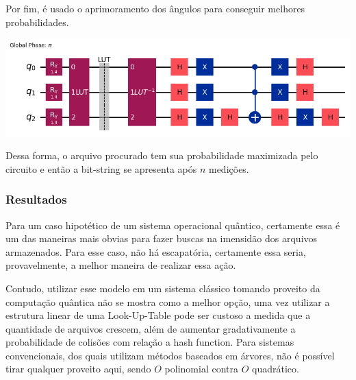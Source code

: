 \documentclass{article}
\begin{document}
Por fim, é usado o aprimoramento dos ângulos para conseguir melhores probabilidades.

\begin{center}
	\includegraphics[scale=0.6]{improved_file_explorer.png}
	\label{fig:file-explorer}
\end{center}

Dessa forma, o arquivo procurado tem sua probabilidade maximizada pelo circuito e então a bit-string se apresenta após $n$ medições.



\subsubsection{Resultados}

Para um caso hipotético de um sistema operacional quântico, certamente essa é um das maneiras mais obvias para fazer buscas na imensidão dos arquivos armazenados. Para esse caso, não há escapatória, certamente essa seria, provavelmente, a melhor maneira de realizar essa ação.

Contudo, utilizar esse modelo em um sistema clássico tomando proveito da computação quântica não se mostra como a melhor opção, uma vez utilizar a estrutura linear de uma Look-Up-Table pode ser custoso a medida que a quantidade de arquivos crescem, além de aumentar gradativamente a probabilidade de colisões com relação a hash function. Para sistemas convencionais, dos quais utilizam métodos baseados em árvores, não é possível tirar qualquer proveito aqui, sendo $O$ polinomial contra $O$ quadrático.
\end{document}

